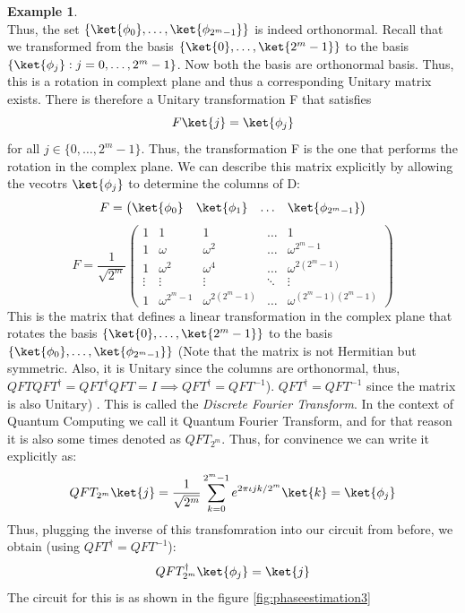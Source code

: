 \documentclass[12pt, oneside]{book}
\theoremstyle{definition}
\theoremstyle{definition}
\newtheorem{example}{Example}[section]
\theoremstyle{remark}
\begin{document}
\begin{example}
\[    \]
    Thus, the set $\{\ket{\phi_0},\ldots,\ket{\phi_{2^m-1}}\}$ is indeed orthonormal.
    Recall that we transformed from the basis $\{\ket{0},\ldots,\ket{2^m-1}\}$ to the basis $\{\ket{\phi_j}:j=0,\ldots,2^m-1\}$. Now both the basis are orthonormal basis.
    Thus, this is a rotation in complext plane and thus a corresponding Unitary matrix exists.
    There is therefore a Unitary transformation F that satisfies
    \[
    F\ket{j}=\ket{\phi_j}
    \]
    for all $j \in \{0,\ldots,2^m-1\}$. Thus, the transformation F is the one that performs the rotation in the complex plane.
    We can describe this matrix explicitly by allowing the vecotrs $\ket{\phi_j}$ to determine the columns of D:
    \[
    F=\begin{pmatrix} \ket{\phi_0} & \ket{\phi_1} & \ldots & \ket{\phi_{2^m-1}} \end{pmatrix}
    \]
    \[
    F=\frac{1}{\sqrt{2^m}}\begin{pmatrix} 1 & 1 & 1 & \ldots & 1 \\ 1 & \omega & \omega^2 & \ldots & \omega^{2^m-1} \\ 1 & \omega^2 & \omega^4 & \ldots & \omega^{2(2^m-1)} \\ \vdots & \vdots & \vdots & \ddots & \vdots \\ 1 & \omega^{2^m-1} & \omega^{2(2^m-1)} & \ldots & \omega^{(2^m-1)(2^m-1)} \end{pmatrix}
    \]
    This is the matrix that defines a linear transformation in the complex plane that rotates the basis $\{\ket{0},\ldots,\ket{2^m-1}\}$ to the basis $\{\ket{\phi_0},\ldots,\ket{\phi_{2^m-1}}\}$ (Note that the matrix is not Hermitian but symmetric. Also, it is Unitary since the 
    columns are orthonormal, thus, $QFT QFT^{\dagger}=QFT^{\dagger}QFT=I \implies QFT^{\dagger}=QFT^{-1}$).
    $QFT^{\dagger}=QFT^{-1}$ since the matrix is also Unitary) .
    This is called the \textit{Discrete Fourier Transform}. In the context of Quantum Computing we call it Quantum Fourier Transform, and for that reason it is also some times denoted as 
    $QFT_{2^m}$. Thus, for convinence we can write it explicitly as:
    \[
    QFT_{2^m}\ket{j}=\frac{1}{\sqrt{2^m}} \sum_{k=0}^{2^m-1} e^{2\pi\iota jk/2^m}\ket{k}=\ket{\phi_j}\]
    Thus, plugging the inverse of this transfomration into our circuit from before, we obtain (using $QFT^{\dagger}=QFT^{-1}$):
    \[
    QFT_{2^m}^{\dagger}\ket{\phi_j}=\ket{j}
    \]
    The circuit for this is as shown in the figure \ref{fig:phaseestimation3}
    \begin{figure}[H]

\end{figure}
\end{example}
\end{document}
